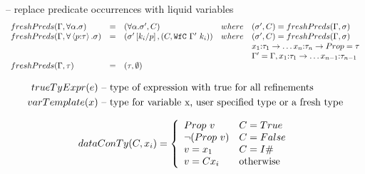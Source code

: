 \hfill \freshPredsty{\sigma}  -- replace predicate occurrences with liquid variables
$$
\begin{array}{lclll}
\freshPredsty{\tall{\alpha}{\sigma}}  
	&=& (\tall{\alpha}{\sigma'}, C) & where& (\sigma', C) = \freshPredsty{\sigma}\\
\freshPredsty{\forall \left\langle p \colon \tau \right\rangle .\sigma}  
	&=& (\sigma'\sub{p}{k_i}, (C,\wfc{\Gamma'}{k_i})) & where& (\sigma', C) = \freshPredsty{\sigma}\\ 
	&&&&  x_1\colon\tau_1 \rightarrow \dots x_n \colon\tau_n \rightarrow Prop= \tau\\
	&&&&  \Gamma' = \Gamma, x_1\colon\tau_1 \rightarrow \dots x_{n-1} \colon\tau_{n-1}\\
\freshPredsty{\tau}  
	&=& (\tau, \emptyset) && \\
\end{array}
$$

\begin{align*}
\truetyExpr{e} & \text{ -- type of expression with true for all refinements}\\
\varTemplate{x} & \text{ -- type for variable x, user specified type or a fresh type}\\
\end{align*}

\begin{align*}
\dataconty{C}{x_i} = 
\left\lbrace \begin{array}{l l}
Prop\ v & C = True\\
\lnot (Prop\ v) & C = False\\
v = x_1 & C = I\# \\
v= C x_i & \text{otherwise}
\end{array}\right.
\end{align*}